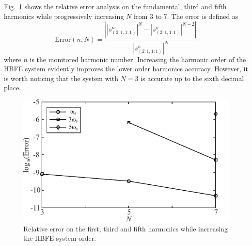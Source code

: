 \documentclass[AMA,STIX2COL]{WileyNJD-v2}
\begin{document}
Fig.~\ref{fig:harm_conv} shows the relative error analysis on the fundamental, third and fifth harmonics while progressively increasing $N$ from 3 to 7. The error is defined as
%
\begin{equation*}
\text{Error}(n,N) = \frac{\left| |{s^n_{(2:1,1:1)}}|^{N} - |{s^n_{(2:1,1:1)}}|^{N-2}\right|}{|{s^n_{(2:1,1:1)}}|^{N}}
\end{equation*}
%
\noindent where $n$ is the monitored harmonic number. Increasing the harmonic order of the HBFE system evidently improves the lower order harmonics accuracy. However, it is worth noticing that the system with $N=3$ is accurate up to the sixth decimal place. 
%
\begin{figure}[ht!]
\centering
\includegraphics[width=\columnwidth]{harm_conv}
\caption{Relative error on the first, third and fifth harmonics while increasing the HBFE system order.}
\label{fig:harm_conv}
\end{figure}
\end{document}
